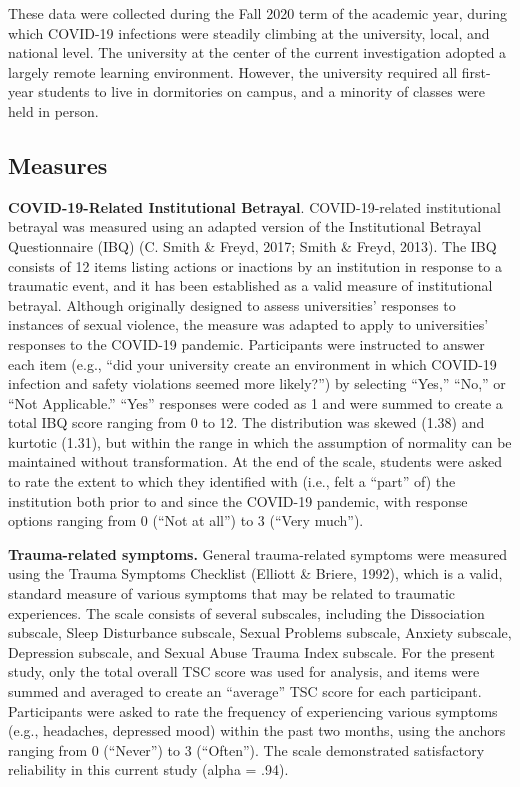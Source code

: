 \documentclass[
  english,
  man, noextraspace]{apa6}
\begin{document}
These data were collected during the Fall 2020 term of the academic year, during which COVID-19 infections were steadily climbing at the university, local, and national level. The university at the center of the current investigation adopted a largely remote learning environment. However, the university required all first-year students to live in dormitories on campus, and a minority of classes were held in person.

\hypertarget{measures}{%
\subsection{Measures}\label{measures}}

\textbf{COVID-19-Related Institutional Betrayal}. COVID-19-related institutional betrayal was measured using an adapted version of the Institutional Betrayal Questionnaire (IBQ) (C. Smith \& Freyd, 2017; Smith \& Freyd, 2013). The IBQ consists of 12 items listing actions or inactions by an institution in response to a traumatic event, and it has been established as a valid measure of institutional betrayal. Although originally designed to assess universities' responses to instances of sexual violence, the measure was adapted to apply to universities' responses to the COVID-19 pandemic. Participants were instructed to answer each item (e.g., \enquote{did your university create an environment in which COVID-19 infection and safety violations seemed more likely?}) by selecting \enquote{Yes,} \enquote{No,} or \enquote{Not Applicable.} \enquote{Yes} responses were coded as 1 and were summed to create a total IBQ score ranging from 0 to 12. The distribution was skewed (1.38) and kurtotic (1.31), but within the range in which the assumption of normality can be maintained without transformation. At the end of the scale, students were asked to rate the extent to which they identified with (i.e., felt a \enquote{part} of) the institution both prior to and since the COVID-19 pandemic, with response options ranging from 0 (\enquote{Not at all}) to 3 (\enquote{Very much}).

\textbf{Trauma-related symptoms.} General trauma-related symptoms were measured using the Trauma Symptoms Checklist (Elliott \& Briere, 1992), which is a valid, standard measure of various symptoms that may be related to traumatic experiences. The scale consists of several subscales, including the Dissociation subscale, Sleep Disturbance subscale, Sexual Problems subscale, Anxiety subscale, Depression subscale, and Sexual Abuse Trauma Index subscale. For the present study, only the total overall TSC score was used for analysis, and items were summed and averaged to create an \enquote{average} TSC score for each participant. Participants were asked to rate the frequency of experiencing various symptoms (e.g., headaches, depressed mood) within the past two months, using the anchors ranging from 0 (\enquote{Never}) to 3 (\enquote{Often}). The scale demonstrated satisfactory reliability in this current study (alpha = .94).
\end{document}
